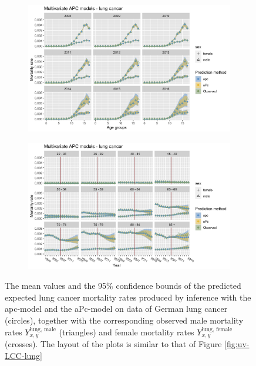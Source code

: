 \begin{figure}[h!]
    \centering
    \begin{subfigure}[b]{.75\linewidth}
        \includegraphics[width=\linewidth]{real-data/real-data-multivariate/Figures/multivariate-APC-by-age-lung.png}
    \end{subfigure}
    
    \begin{subfigure}[b]{.75\linewidth}
        \includegraphics[width=\linewidth]{real-data/real-data-multivariate/Figures/multivariate-APC-by-period-lung.png}
    \end{subfigure}
    
    \caption{The mean values and the 95\% confidence bounds of the predicted expected lung cancer mortality rates produced by inference with the apc-model and the aPc-model on data of German lung cancer (circles), together with the corresponding observed male mortality rates $Y_{x,y}^{\text{lung, male}}$ (triangles) and female mortality rates $Y_{x,y}^{\text{lung, female}}$ (crosses). The layout of the plots is similar to that of Figure \ref{fig:uv-LCC-lung}}
    \label{fig:mv-APC-lung}
\end{figure}

